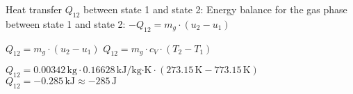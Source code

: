 Heat transfer \( Q_{12} \) between state 1 and state 2:  
Energy balance for the gas phase between state 1 and state 2:  
\( -Q_{12} = m_g \cdot (u_2 - u_1) \)  

\( Q_{12} = m_g \cdot (u_2 - u_1) \)  
\( Q_{12} = m_g \cdot c_V \cdot (T_2 - T_1) \)  

\( Q_{12} = 0.00342 \, \text{kg} \cdot 0.16628 \, \text{kJ/kg·K} \cdot (273.15 \, \text{K} - 773.15 \, \text{K}) \)  
\( Q_{12} = -0.285 \, \text{kJ} \approx -285 \, \text{J} \)